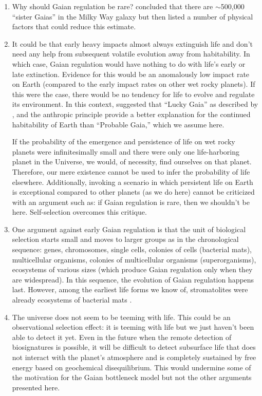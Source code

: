 \begin{enumerate}
	\item Why should Gaian regulation be rare? \citet{Franck2002,Franck2001} concluded that there are $\sim$500,000 ``sister Gaias'' in the Milky Way galaxy but then listed a number of physical factors \citep[\eg, those discussed by][]{Ward2000} that could reduce this estimate.
	
	\item It could be that early heavy impacts almost always extinguish life and don't need any help from subsequent volatile evolution away from habitability. In which case, Gaian regulation would have nothing to do with life's early or late extinction. Evidence for this would be an anomalously low impact rate on Earth (compared to the early impact rates on other wet rocky planets). If this were the case, there would be no tendency for life to evolve and regulate its environment. In this context, \citet{Tyrrell2013} suggested that ``Lucky Gaia'' as described by \citet{Free2007}, and the anthropic principle provide a better explanation for the continued habitability of Earth than ``Probable Gaia,'' which we assume here.
	
	If the probability of the emergence and persistence of life on wet rocky planets were infinitesimally small and there were only one life-harboring planet in the Universe, we would, of necessity, find ourselves on that planet. Therefore, our mere existence cannot be used to infer the probability of life elsewhere. Additionally, invoking a scenario in which persistent life on Earth is exceptional compared to other planets (as we do here) cannot be criticized with an argument such as: if Gaian regulation is rare, then we shouldn't be here. Self-selection overcomes this critique. 

	\item One argument against early Gaian regulation is that the unit of biological selection starts small and moves to larger groups as in the chronological sequence: genes, chromosomes, single cells, colonies of cells (bacterial mats), multicellular organisms, colonies of multicellular organisms (superorganisms), ecosystems of various sizes (which produce Gaian regulation only when they are widespread). In this sequence, the evolution of Gaian regulation happens last. However, among the earliest life forms we know of, stromatolites were already ecosystems of bacterial mats \citep{Walter1992}.
	
	\item The universe does not seem to be teeming with life.
	This could be an observational selection effect: it is teeming with life but we just haven't been able to detect it yet. Even in the future when the remote detection of biosignatures is possible, it will be difficult to detect subsurface life \citep{Boston1992,Gaidos1999,Jones2011,McMahon2013} that does not interact with the planet's atmosphere and is completely sustained by free energy based on geochemical disequilibrium.
	This would undermine some of the motivation for the Gaian bottleneck model but not the other arguments presented here.
\end{enumerate}


